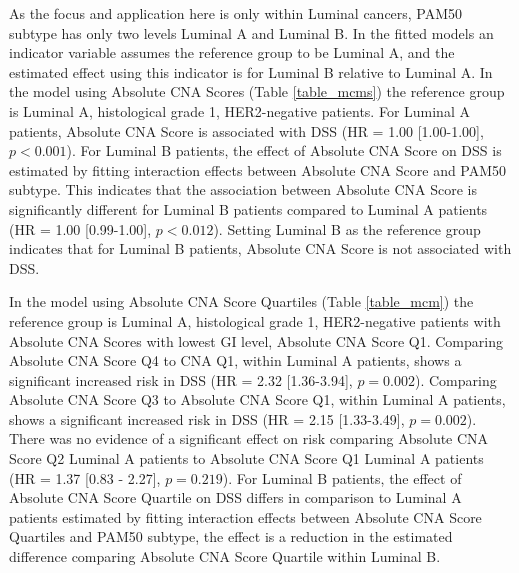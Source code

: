 As the focus and application here is only within Luminal cancers, PAM50 subtype has only two levels Luminal A and Luminal B. In the fitted models an indicator variable assumes the reference group to be Luminal A, and the estimated effect using this indicator is for Luminal B relative to Luminal A. In the model using Absolute CNA Scores (Table \ref{table_mcms}) the reference group is Luminal A, histological grade 1, HER2-negative patients. For Luminal A patients, Absolute CNA Score is associated with DSS (HR = 1.00 [1.00-1.00], $p < 0.001$). For Luminal B patients, the effect of Absolute CNA Score on DSS is estimated by fitting interaction effects between Absolute CNA Score and PAM50 subtype. This indicates that the association between Absolute CNA Score is significantly different for Luminal B patients compared to Luminal A patients (HR = 1.00 [0.99-1.00], $p < 0.012$). Setting Luminal B as the reference group indicates that for Luminal B patients, Absolute CNA Score is not associated with DSS.  

In the model using Absolute CNA Score Quartiles (Table \ref{table_mcm}) the reference group is Luminal A, histological grade 1, HER2-negative patients with Absolute CNA Scores with lowest GI level, Absolute CNA Score Q1. Comparing Absolute CNA Score Q4 to CNA Q1, within Luminal A patients, shows a significant increased risk in DSS (HR = 2.32 [1.36-3.94], $p = 0.002$). Comparing Absolute CNA Score Q3 to Absolute CNA Score Q1, within Luminal A patients, shows a significant increased risk in DSS (HR = 2.15 [1.33-3.49], $p = 0.002$). There was no evidence of a significant effect on risk comparing Absolute CNA Score Q2 Luminal A patients to Absolute CNA Score Q1 Luminal A patients (HR = 1.37 [0.83 - 2.27], $p = 0.219$). For Luminal B patients, the effect of Absolute CNA Score Quartile on DSS differs in comparison to Luminal A patients estimated by fitting interaction effects between Absolute CNA Score Quartiles and PAM50 subtype, the effect is a reduction in the estimated difference comparing Absolute CNA Score Quartile within Luminal B. 


